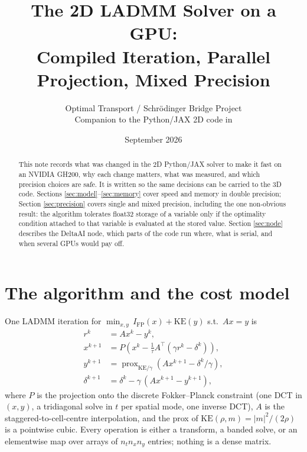 \documentclass[11pt]{article}
\title{The 2D LADMM Solver on a GPU:\\ Compiled Iteration, Parallel Projection, Mixed Precision}
\author{Optimal Transport / Schr\"odinger Bridge Project\\
Companion to the Python/JAX 2D code in \code{python/2d/setup}}
\date{September 2026}
\newcommand{\KE}{\mathrm{KE}}
\begin{document}
\maketitle

\begin{abstract}
This note records what was changed in the 2D Python/JAX solver to make it fast on an
NVIDIA GH200, why each change matters, what was measured, and which precision choices
are safe. It is written so the same decisions can be carried to the 3D code. Sections
\ref{sec:model}--\ref{sec:memory} cover speed and memory in double precision; Section
\ref{sec:precision} covers single and mixed precision, including the one non-obvious
result: the algorithm tolerates float32 storage of a variable only if the optimality
condition attached to that variable is evaluated at the stored value. Section
\ref{sec:node} describes the DeltaAI node, which parts of the code run where, what is
serial, and when several GPUs would pay off.
\end{abstract}

\section{The algorithm and the cost model}\label{sec:model}

One LADMM iteration for $\min_{x,y}\, I_{\mathrm{FP}}(x) + \KE(y)$ s.t.\ $Ax = y$ is
\begin{align}
  r^k &= A x^k - y^k, \label{eq:r}\\
  x^{k+1} &= P\!\left(x^k - \tfrac{1}{\tau} A^{\!\top}(\gamma r^k - \delta^k)\right),
  \label{eq:x}\\
  y^{k+1} &= \operatorname{prox}_{\KE/\gamma}\!\left(A x^{k+1} - \delta^k/\gamma\right),
  \label{eq:y}\\
  \delta^{k+1} &= \delta^k - \gamma\,(A x^{k+1} - y^{k+1}), \label{eq:delta}
\end{align}
where $P$ is the projection onto the discrete Fokker--Planck constraint (one DCT in
$(x,y)$, a tridiagonal solve in $t$ per spatial mode, one inverse DCT), $A$ is the
staggered-to-cell-centre interpolation, and the prox of $\KE(\rho,m)=|m|^2/(2\rho)$ is a
pointwise cubic. Every operation is either a transform, a banded solve, or an elementwise
map over arrays of $n_t n_x n_y$ entries; nothing is a dense matrix.
\end{document}
